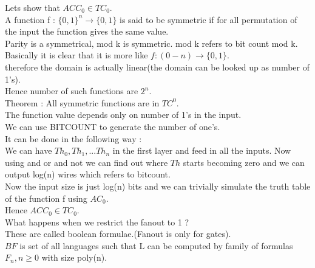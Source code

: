 \documentclass[solution,addpoints,12pt]{exam}
\begin{document}
Lets show that ${ACC}_0 \in {TC}_0$.\\
A function f : ${\{0, 1\}}^n \rightarrow \{0, 1\}$
is said to be symmetric if for all permutation
of the input the function gives the same value.\\
Parity is a symmetrical, mod k is symmetric. mod k refers
to bit count mod k.\\
Basically it is clear that it is more like $f : (0-n) \rightarrow \{0, 1\}$.\\
therefore the domain is actually linear(the domain can be looked up as
number of 1's).\\
Hence number of such functions are $2^n$.\\
Theorem : All symmetric functions are in ${TC}^0$.\\
The function value depends only on number of 1's in the input.\\
We can use BITCOUNT to generate the number of one's.\\
It can be done in the following way :\\
We can have $Th_0, Th_1, ... Th_n$  in the first layer and feed in
all the inputs. Now using and or and not we can find out where
$Th$ starts becoming zero and we can output log(n) wires which refers
to bitcount.\\
Now the input size is just log(n) bits and we can trivially simulate
the truth table of the function f using ${AC}_0$.\\

Hence ${ACC}_0 \in {TC}_0$.\\

What happens when we restrict the fanout to 1 ?\\
These are called boolean formulae.(Fanout is only for gates).\\
$BF$ is set of all languages such that L can be computed
by family of formulas $F_n, n \ge 0$ with size poly(n).\\
\end{document}
